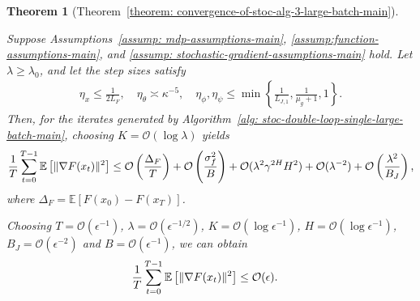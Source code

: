 \documentclass{article}
\theoremstyle{plain}
\newtheorem{theorem}{Theorem}
\theoremstyle{definition}
\theoremstyle{remark}
\def\E{\mathbb E}
\def\cO{\mathcal O}
\begin{document}
\begin{theorem}[Theorem~\ref{theorem: convergence-of-stoc-alg-3-large-batch-main}]
    \label{theorem: convergence-of-stoc-alg-3-large-batch}

    Suppose Assumptions~\ref{assump: mdp-assumptions-main},
\ref{assump:function-assumptions-main}, and
\ref{assump: stochastic-gradient-assumptions-main} hold.
Let $\lambda \geq \lambda_0$, and let the step sizes satisfy
\begin{gather*}
    \eta_x \leq \frac{1}{2L_F}, \quad
    \eta_\theta \asymp \kappa^{-5}, \quad
    \eta_\phi,\eta_\psi
    \leq
    \min \left\{
        \frac{1}{L_{J,1}},
        \frac{1}{\mu_g+1},
        1
    \right\}.
\end{gather*}
Then, for the iterates generated by
Algorithm~\ref{alg: stoc-double-loop-single-large-batch-main}, choosing
$K=\mathcal{O}(\log \lambda)$ yields
\begin{align}
            \frac{1}{T}\sum_{t=0}^{T-1} \E \left[ \|\nabla F(x_t)  \|^2\right]  \leq \cO\left(\frac{\Delta_F }{T}\right)  + \cO\left(\frac{\sigma_f^2}{B}\right) + \cO(\lambda^2\gamma^{2H}H^2) +  \cO(\lambda^{-2}) + \cO\left(\frac{\lambda^2}{B_J}\right) , \notag 
        \end{align}
        where $\Delta_F = \E \left[ F(x_0) - F(x_T) \right]$.

        Choosing $T = \cO(\epsilon^{-1})$, $\lambda = \cO(\epsilon^{-1/2})$, $K = \cO(\log \epsilon^{-1})$, $H = \cO(\log \epsilon^{-1})$, $B_{J} = \cO(\epsilon^{-2})$ and $B = \cO(\epsilon^{-1})$, 
         we can obtain
        \begin{align}
            \frac{1}{T}\sum_{t=0}^{T-1} \E \left[ \|\nabla F(x_t)  \|^2 \right] & \leq \cO(\epsilon). \notag 
        \end{align}
\end{theorem}
\end{document}
